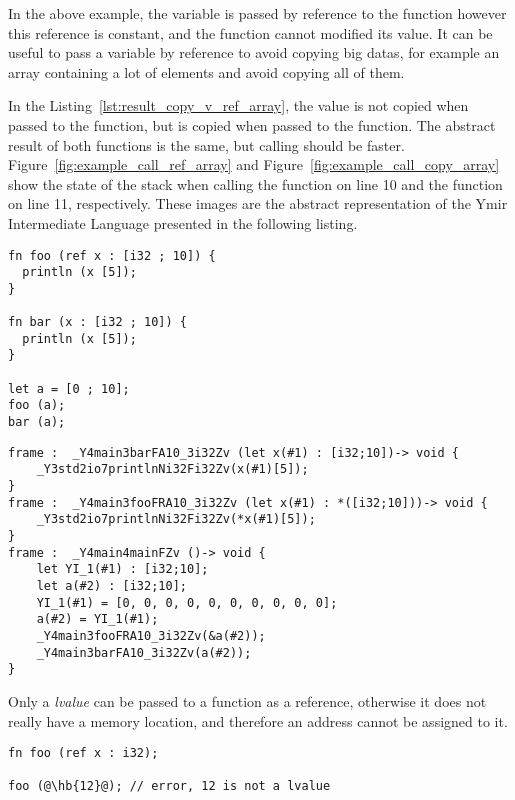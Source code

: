 In the above example, the variable  is passed by reference to the
function  however this reference is constant, and the function
 cannot modified its value. It can be useful to pass a variable by
reference to avoid copying big datas, for example an array containing a lot of
elements and avoid copying all of them.



In the Listing~\ref{lst:result_copy_v_ref_array}, the value is not copied when passed to the 
function, but is copied when passed to the  function. The abstract
result of both functions is the same, but calling  should be faster.
Figure~\ref{fig:example_call_ref_array} and
Figure~\ref{fig:example_call_copy_array} show the state of the stack when
calling the  function on line 10 and the  function on
line 11, respectively. These images are the abstract representation of the Ymir
Intermediate Language presented in the following listing.

\begin{lstlisting}[style=coloredverbatim, label=lst:result_copy_v_ref_array, caption=Example of passing an array by reference vs. by value]
fn foo (ref x : [i32 ; 10]) {
  println (x [5]);
}

fn bar (x : [i32 ; 10]) {
  println (x [5]);
}

let a = [0 ; 10];
foo (a);
bar (a);
\end{lstlisting}

\begin{lstlisting}[style=intermediateVerb, caption=YIL result of Listing~\ref{lst:result_copy_v_ref_array}]
frame :  _Y4main3barFA10_3i32Zv (let x(#1) : [i32;10])-> void {
    _Y3std2io7printlnNi32Fi32Zv(x(#1)[5]);
}
frame :  _Y4main3fooFRA10_3i32Zv (let x(#1) : *([i32;10]))-> void {
    _Y3std2io7printlnNi32Fi32Zv(*x(#1)[5]);
}
frame :  _Y4main4mainFZv ()-> void {
    let YI_1(#1) : [i32;10];
    let a(#2) : [i32;10];
    YI_1(#1) = [0, 0, 0, 0, 0, 0, 0, 0, 0, 0];
    a(#2) = YI_1(#1);
    _Y4main3fooFRA10_3i32Zv(&a(#2));
    _Y4main3barFA10_3i32Zv(a(#2));
}
\end{lstlisting}

Only a \textit{lvalue} can be passed to a function as a reference, otherwise it
does not really have a memory location, and therefore an address cannot be
assigned to it.

\begin{lstlisting}[style=coloredverbatim, escapechar=@]
fn foo (ref x : i32);

foo (@\hb{12}@); // error, 12 is not a lvalue
\end{lstlisting}

